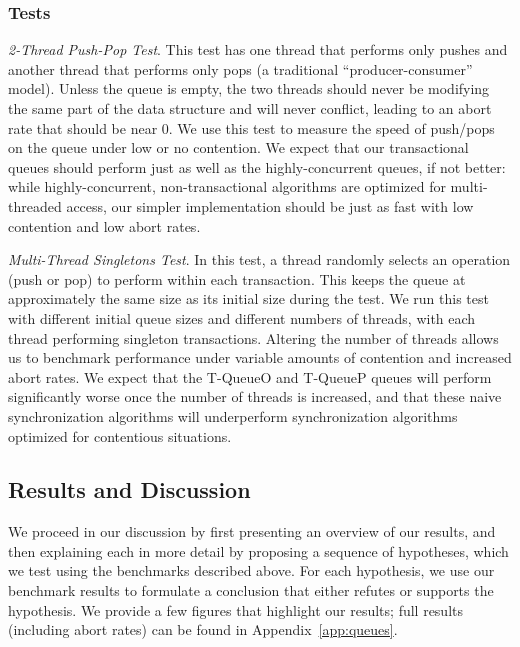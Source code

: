 \subsubsection{Tests}
    \emph{2-Thread Push-Pop Test}. This test has one thread that performs only pushes and another thread that performs only pops (a traditional ``producer-consumer'' model). Unless the queue is empty, the two threads should never be modifying the same part of the data structure and will never conflict, leading to an abort rate that should be near 0. We use this test to measure the speed of push/pops on the queue under low or no contention. We expect that our transactional queues should perform just as well as the highly-concurrent queues, if not better: while highly-concurrent, non-transactional algorithms are optimized for multi-threaded access, our simpler implementation should be just as fast with low contention and low abort rates.

\emph{Multi-Thread Singletons Test}.
    In this test, a thread randomly selects an operation (push or pop) to perform within each transaction. This keeps the queue at approximately the same size as its initial size during the test. We run this test with different initial queue sizes and different numbers of threads, with each thread performing singleton transactions. Altering the number of threads allows us to benchmark performance under variable amounts of contention and increased abort rates. We expect that the T-QueueO and T-QueueP queues will perform significantly worse once the number of threads is increased, and that these naive synchronization algorithms will underperform synchronization algorithms optimized for contentious situations.

\subsection{Results and Discussion}

We proceed in our discussion by first presenting an overview of our results, and then explaining each in more detail by proposing a sequence of hypotheses, which we test using the benchmarks described above. For each hypothesis, we use our benchmark results to formulate a conclusion that either refutes or supports the hypothesis.
We provide a few figures that highlight our results; full results (including abort rates) can be found in Appendix~\ref{app:queues}. 

